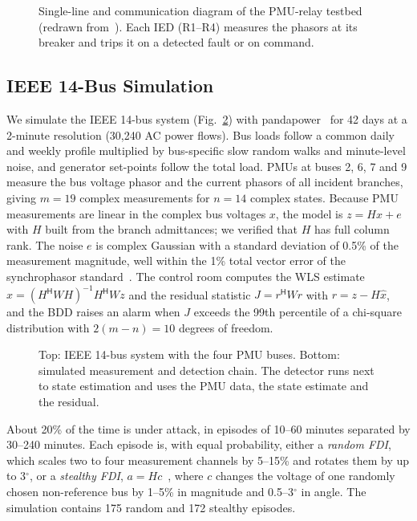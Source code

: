 \documentclass[conference]{IEEEtran}
\begin{document}
\begin{figure}[t]
\centering
\resizebox{\columnwidth}{!}{}
\caption{Single-line and communication diagram of the PMU-relay testbed (redrawn from~\cite{morris2014dataset}). Each IED (R1--R4) measures the phasors at its breaker and trips it on a detected fault or on command.}
\label{fig:testbed}
\end{figure}

\subsection{IEEE 14-Bus Simulation}
We simulate the IEEE 14-bus system (Fig.~\ref{fig:ieee14}) with pandapower~\cite{thurner2018pandapower} for 42 days at a 2-minute resolution (30{,}240 AC power flows). Bus loads follow a common daily and weekly profile multiplied by bus-specific slow random walks and minute-level noise, and generator set-points follow the total load. PMUs at buses 2, 6, 7 and 9 measure the bus voltage phasor and the current phasors of all incident branches, giving $m=19$ complex measurements for $n=14$ complex states. Because PMU measurements are linear in the complex bus voltages $x$, the model is $z=Hx+e$ with $H$ built from the branch admittances; we verified that $H$ has full column rank. The noise $e$ is complex Gaussian with a standard deviation of 0.5\% of the measurement magnitude, well within the 1\% total vector error of the synchrophasor standard~\cite{ieee2011c37118}. The control room computes the WLS estimate $\hat{x}=(H^{\mathsf H}WH)^{-1}H^{\mathsf H}Wz$ and the residual statistic $J=r^{\mathsf H}Wr$ with $r=z-H\hat{x}$, and the BDD raises an alarm when $J$ exceeds the 99th percentile of a chi-square distribution with $2(m-n)=10$ degrees of freedom.

\begin{figure}[t]
\centering
\resizebox{0.72\columnwidth}{!}{}

\vspace{4pt}
\resizebox{\columnwidth}{!}{}
\caption{Top: IEEE 14-bus system with the four PMU buses. Bottom: simulated measurement and detection chain. The detector runs next to state estimation and uses the PMU data, the state estimate and the residual.}
\label{fig:ieee14}
\end{figure}

About 20\% of the time is under attack, in episodes of 10--60 minutes separated by 30--240 minutes. Each episode is, with equal probability, either a \emph{random FDI}, which scales two to four measurement channels by 5--15\% and rotates them by up to 3$^\circ$, or a \emph{stealthy FDI}, $a=Hc$~\cite{liu2011fdi}, where $c$ changes the voltage of one randomly chosen non-reference bus by 1--5\% in magnitude and 0.5--3$^\circ$ in angle. The simulation contains 175 random and 172 stealthy episodes.
\end{document}
